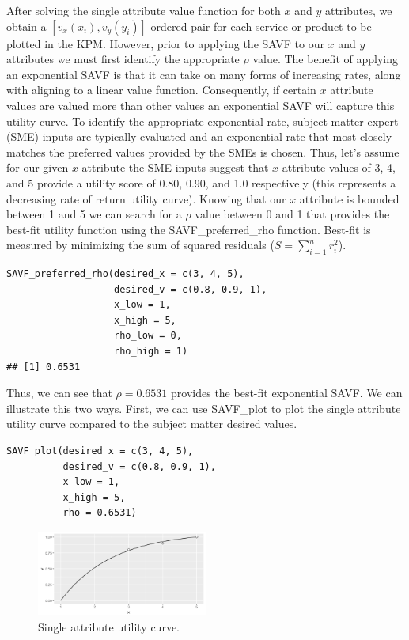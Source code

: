 \documentclass[twocolumn]{svjour3}       %
\begin{document}
After solving the single attribute value function for both $x$ and $y$ attributes, we obtain a $\left[v_x\left(x_i\right), v_y\left(y_i\right)\right]$ ordered pair for each service or product to be plotted in the KPM.  However, prior to applying the SAVF to our $x$ and $y$ attributes we must first identify the appropriate $\rho$ value. The benefit of applying an exponential SAVF is that it can take on many forms of increasing rates, along with aligning to a linear value function. Consequently, if certain $x$ attribute values are valued more than other values an exponential SAVF will capture this utility curve. To identify the appropriate exponential rate, subject matter expert (SME) inputs are typically evaluated and an exponential rate that most closely matches the preferred values provided by the SMEs is chosen. Thus, let's assume for our given $x$ attribute the SME inputs suggest that $x$ attribute values of 3, 4, and 5 provide a utility score of 0.80, 0.90, and 1.0 respectively (this represents a decreasing rate of return utility curve). Knowing that our $x$ attribute is bounded between 1 and 5 we can search for a $\rho$ value between 0 and 1 that provides the best-fit utility function using the SAVF\_preferred\_rho function.  Best-fit is measured by minimizing the sum of squared residuals ($S = \sum_{i = 1}^n r_i ^ 2$).
\begin{Verbatim}[fontsize=\footnotesize]
SAVF_preferred_rho(desired_x = c(3, 4, 5),
                   desired_v = c(0.8, 0.9, 1),
                   x_low = 1,
                   x_high = 5,
                   rho_low = 0,
                   rho_high = 1)
## [1] 0.6531
\end{Verbatim}

Thus, we can see that $\rho = 0.6531$ provides the best-fit exponential SAVF. We can illustrate this two ways. First, we can use SAVF\_plot to plot the single attribute utility curve compared to the subject matter desired values.
\begin{Verbatim}[fontsize=\footnotesize]
SAVF_plot(desired_x = c(3, 4, 5),
          desired_v = c(0.8, 0.9, 1),
          x_low = 1,
          x_high = 5,
          rho = 0.6531)
\end{Verbatim}

\begin{figure}[!htb]
  \includegraphics[width=0.5\textwidth]{fig3.png}
  \caption{Single attribute utility curve.}
  \label{fig:3}
\end{figure}
\end{document}
